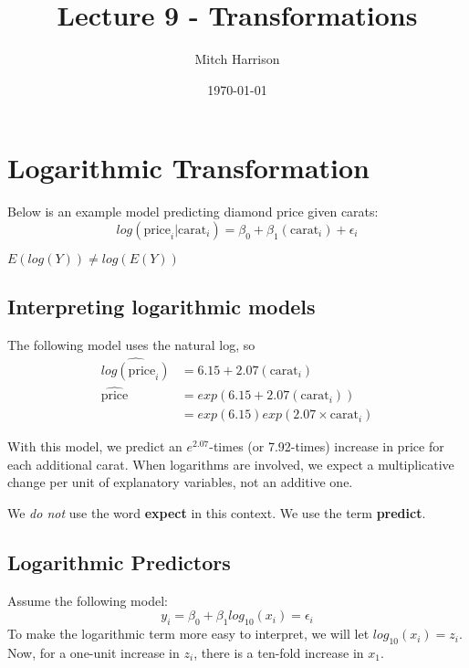 \documentclass[titlepage, 12pt, leqno]{article}
\title{\Huge{Lecture 9 - Transformations}}
\author{\large{Mitch Harrison}}
\date{\today}
\begin{document}
\setlength{\parskip}{1\baselineskip}
\setlength{\parindent}{15pt}
\maketitle
\tableofcontents
\newpage


\section{Logarithmic Transformation}
Below is an example model predicting diamond price given carats:
\[
log( \text{price}_i | \text{carat}_i) = \beta_0 + \beta_1( \text{carat}_i)
+\epsilon_i
\]
\begin{note}
    $E(log(Y)) \ne log(E(Y))$
\end{note}

\subsection{Interpreting logarithmic models}
The following model uses the natural log, so 
\begin{align*}
    \widehat{log( \text{price}_i)} &= 6.15 + 2.07( \text{carat}_i) \\
    \widehat{ \text{price}} &= exp(6.15 + 2.07( \text{carat}_i)) \\
                                   &= exp(6.15)exp(2.07 \times \text{carat}_i)
\end{align*}

With this model, we predict an $e^{2.07}$-times (or 7.92-times) increase in price 
for each additional carat. When logarithms are involved, we expect a 
multiplicative change per unit of explanatory variables, not an additive one.

\begin{note}
    We \textit{do not} use the word \textbf{expect} in this context. We use the
    term \textbf{predict}.
\end{note}

\subsection{Logarithmic Predictors}
Assume the following model:
\[
y_i = \beta_0 + \beta_1log_10(x_i) = \epsilon_i
\]
To make the logarithmic term more easy to interpret, we will let $log_{10}(x_i)
= z_i$. Now, for a one-unit increase in $z_i$, there is a ten-fold increase in
$x_1$.
\end{document}

